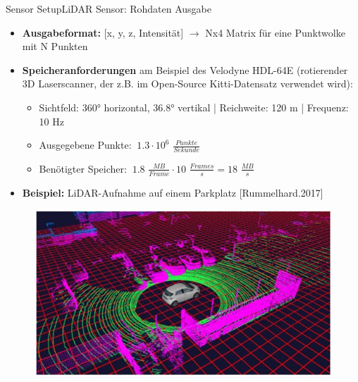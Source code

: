 \documentclass[169, handout	]{THIbeamer} %
\begin{document}
	\begin{frame}{Sensor Setup}{LiDAR Sensor: Rohdaten Ausgabe}
		\begin{itemize}
			\item \textbf{Ausgabeformat:} [x, y, z, Intensität] $\rightarrow$ Nx4 Matrix für eine Punktwolke mit N Punkten
			\item \textbf{Speicheranforderungen} am Beispiel des Velodyne HDL-64E (rotierender 3D Laserscanner, der z.B. im  Open-Source Kitti-Datensatz verwendet wird):
			\begin{itemize}
				\item Sichtfeld: 360° horizontal, 36.8° vertikal | Reichweite: 120 m | Frequenz: 10 Hz
				\item Ausgegebene Punkte: $~ 1.3 \cdot 10^{6}$ $\frac{Punkte}{Sekunde}$ 
				\item Benötigter Speicher: $~1.8$ $\frac{MB}{Frame} \cdot 10$ $\frac{Frames}{s} = 18$  $\frac{MB}{s}$
			\end{itemize}			 
			\item \textbf{Beispiel:} LiDAR-Aufnahme auf einem Parkplatz [Rummelhard.2017]
		\end{itemize}					
		\begin{figure}
			\includegraphics[scale=0.35]{required/LiDAR auf Parkplatz.jpg}
		\end{figure}
	\end{frame}
\end{document}
